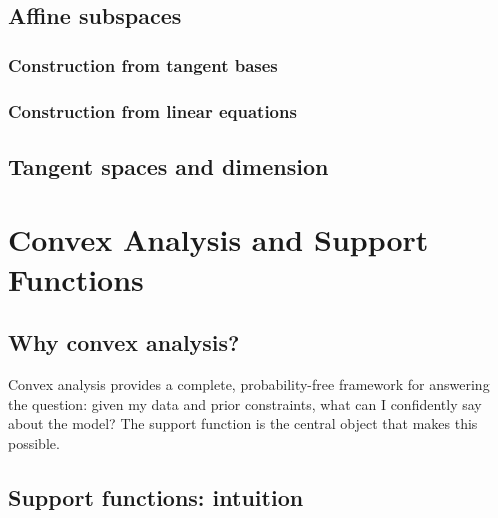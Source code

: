 \documentclass[11pt,twoside,openright]{book}
\theoremstyle{plain}
\theoremstyle{definition}
\theoremstyle{remark}
\begin{document}
\section{Affine subspaces}
\label{sec:affine-subspaces}

\subsection{Construction from tangent bases}
\label{ssec:tangent-basis}

\subsection{Construction from linear equations}
\label{ssec:from-linear-equation}

\section{Tangent spaces and dimension}
\label{sec:tangent-spaces}


\chapter{Convex Analysis and Support Functions}
\label{ch:convex-analysis}

\section{Why convex analysis?}
\label{sec:why-convex-analysis}

\begin{whybox}
Convex analysis provides a complete, probability-free framework for
answering the question: given my data and prior constraints, what can I
confidently say about the model? The support function is the central
object that makes this possible.
\end{whybox}

\section{Support functions: intuition}
\label{sec:support-intuition}
\end{document}

